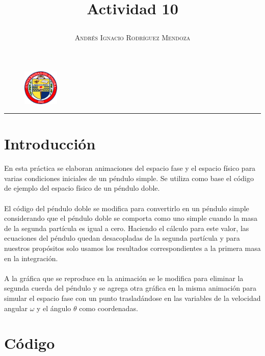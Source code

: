 \documentclass[11pt,spanish]{article}
\title{\vspace{-3cm}\begin{flushleft}\textbf{Actividad 10}\end{flushleft}}
\author{\hspace{-9.6cm}\textsc{Andrés Ignacio Rodríguez Mendoza}}
\date{}
\begin{document}
\begin{figure}
  \begin{center}
   \vspace{-5.4cm} \includegraphics[width=0.15\textwidth]{uni}
  \end{center}
\end{figure}

\maketitle  
\begin{center}
\rule{\textwidth}{1pt}
\end{center}
\section*{Introducción}
En esta práctica se elaboran animaciones del espacio fase y el espacio físico para varias condiciones iniciales de un péndulo simple. Se utiliza como base el código de ejemplo del espacio físico de un péndulo doble.\\ \\
El código del péndulo doble se modifica para convertirlo en un péndulo simple considerando que el péndulo doble se comporta como uno simple cuando la masa de la segunda partícula es igual a cero. Haciendo el cálculo para este valor, las ecuaciones del péndulo quedan desacopladas de la segunda partícula y para nuestros propósitos solo usamos los resultados correspondientes a la primera masa en la integración.\\ \\
A la gráfica que se reproduce en la animación se le modifica para eliminar la segunda cuerda del péndulo y se agrega otra gráfica en la misma animación para simular el espacio fase con un punto trasladándose en las variables de la velocidad angular $\omega$ y el ángulo $\theta$ como coordenadas.

\section*{Código}
\end{document}
